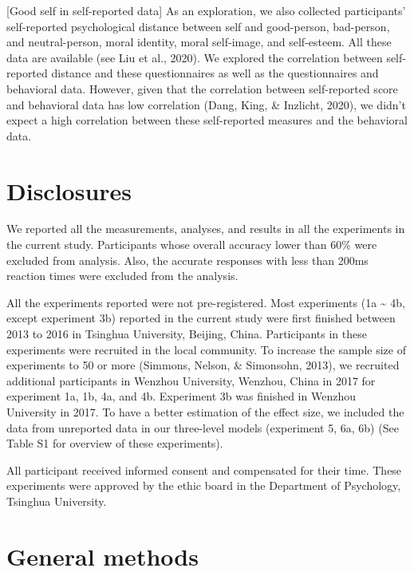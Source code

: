 \documentclass[
  english,
  man]{apa6}
\begin{document}
{[}Good self in self-reported data{]}
As an exploration, we also collected participants' self-reported psychological distance between self and good-person, bad-person, and neutral-person, moral identity, moral self-image, and self-esteem. All these data are available (see Liu et al., 2020). We explored the correlation between self-reported distance and these questionnaires as well as the questionnaires and behavioral data. However, given that the correlation between self-reported score and behavioral data has low correlation (Dang, King, \& Inzlicht, 2020), we didn't expect a high correlation between these self-reported measures and the behavioral data.

\hypertarget{disclosures}{%
\section{Disclosures}\label{disclosures}}

We reported all the measurements, analyses, and results in all the experiments in the current study. Participants whose overall accuracy lower than 60\% were excluded from analysis. Also, the accurate responses with less than 200ms reaction times were excluded from the analysis.

All the experiments reported were not pre-registered. Most experiments (1a \textasciitilde{} 4b, except experiment 3b) reported in the current study were first finished between 2013 to 2016 in Tsinghua University, Beijing, China. Participants in these experiments were recruited in the local community. To increase the sample size of experiments to 50 or more (Simmons, Nelson, \& Simonsohn, 2013), we recruited additional participants in Wenzhou University, Wenzhou, China in 2017 for experiment 1a, 1b, 4a, and 4b. Experiment 3b was finished in Wenzhou University in 2017. To have a better estimation of the effect size, we included the data from unreported data in our three-level models (experiment 5, 6a, 6b) (See Table S1 for overview of these experiments).

All participant received informed consent and compensated for their time. These experiments were approved by the ethic board in the Department of Psychology, Tsinghua University.

\hypertarget{general-methods}{%
\section{General methods}\label{general-methods}}
\end{document}
